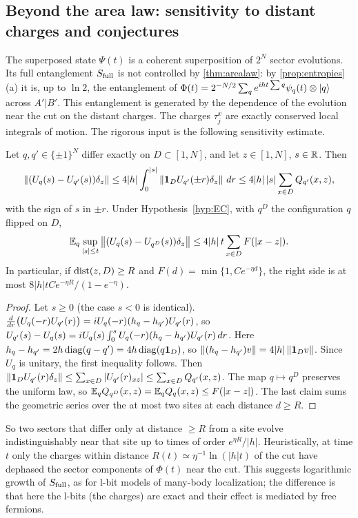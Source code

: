 \subsection{Beyond the area law: sensitivity to distant charges and conjectures}\label{sec:main:conj}

The superposed state $\Psi(t)$ is a coherent superposition of $2^N$ sector evolutions.  Its full entanglement $S_{\mathrm{full}}$
is not controlled by \cref{thm:arealaw}: by \cref{prop:entropies}(a) it is, up to $\ln2$, the entanglement of
$\Phi(t)=2^{-N/2}\sum_qe^{iht\sum q}\psi_q(t)\otimes|q\rangle$ across $A'|B'$.  This entanglement is generated by the dependence
of the evolution near the cut on the distant charges.  The charges $\tau^x_j$ are exactly conserved local
integrals of motion.  The rigorous input is the following sensitivity estimate.

\begin{lemma}\label{lem:duhamel}
Let $q,q'\in\{\pm1\}^N$ differ exactly on $D\subset[1,N]$, and let $z\in[1,N]$, $s\in\mathbb{R}$.  Then
\[
  \left\|(U_q(s)-U_{q'}(s))\delta_z\right\|\le4|h|\int_0^{|s|}\left\|\mathbf{1}_DU_{q'}(\pm r)\delta_z\right\|\,dr\le4|h|\,|s|\sum_{x\in D}Q_{q'}(x,z),
\]
with the sign of $s$ in $\pm r$.  Under Hypothesis~\ref{hyp:EC}, with $q^D$ the configuration $q$ flipped on $D$,
\[
  \mathbb{E}_q\sup_{|s|\le t}\left\|(U_q(s)-U_{q^D}(s))\delta_z\right\|\le4|h|\,t\sum_{x\in D}F(|x-z|).
\]
In particular, if $\operatorname{dist}(z,D)\ge R$ and $F(d)=\min\{1,Ce^{-\eta d}\}$, the right side is at most
$8|h|tCe^{-\eta R}/(1-e^{-\eta})$.
\end{lemma}

\begin{proof}
Let $s\ge0$ (the case $s<0$ is identical).  $\frac{d}{dr}\bigl(U_q(-r)U_{q'}(r)\bigr)=iU_q(-r)(h_{q}-h_{q'})U_{q'}(r)$, so
$U_{q'}(s)-U_q(s)=iU_q(s)\int_0^sU_q(-r)(h_{q}-h_{q'})U_{q'}(r)\,dr$.  Here $h_{q}-h_{q'}=2h\operatorname{diag}(q-q')=4h\operatorname{diag}(q\mathbf{1}_D)$, so
$\left\|(h_{q}-h_{q'})v\right\|=4|h|\left\|\mathbf{1}_Dv\right\|$.  Since $U_q$ is unitary, the first inequality follows.  Then
$\left\|\mathbf{1}_DU_{q'}(r)\delta_z\right\|\le\sum_{x\in D}|U_{q'}(r)_{xz}|\le\sum_{x\in D}Q_{q'}(x,z)$.  The map $q\mapsto q^D$ preserves the
uniform law, so $\mathbb{E}_qQ_{q^D}(x,z)=\mathbb{E}_qQ_q(x,z)\le F(|x-z|)$.  The last claim sums the geometric series over the at most two
sites at each distance $d\ge R$.
\end{proof}

So two sectors that differ only at distance $\ge R$ from a site evolve indistinguishably near that site up to times of
order $e^{\eta R}/|h|$.  Heuristically, at time $t$ only the charges within distance
$R(t)\simeq\eta^{-1}\ln(|h|t)$ of the cut have dephased the sector components of $\Phi(t)$ near the cut.  This
suggests logarithmic growth of $S_{\mathrm{full}}$, as for l-bit models of many-body localization; the difference is that here
the l-bits (the charges) are exact and their effect is mediated by free fermions.

